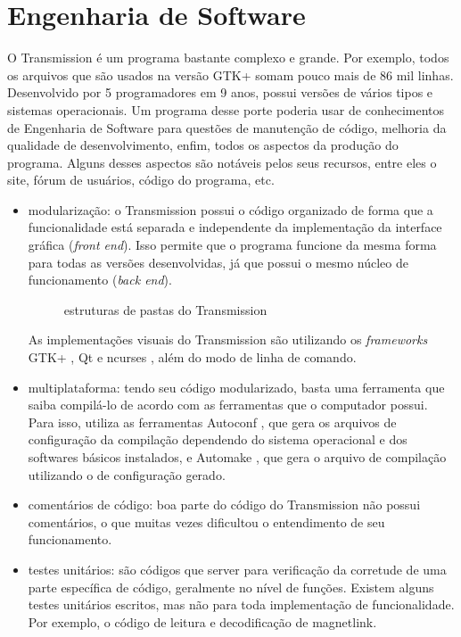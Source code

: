 
\section{Engenharia de Software}

O Transmission é um programa bastante complexo e grande. Por exemplo, todos os arquivos
que são usados na versão GTK+ somam pouco mais de 86 mil linhas. Desenvolvido por 5
programadores em 9 anos, possui versões de vários tipos e sistemas operacionais. Um
programa desse porte poderia usar de conhecimentos de Engenharia de Software para
questões de manutenção de código, melhoria da qualidade de desenvolvimento, enfim,
todos os aspectos da produção do programa. Alguns desses aspectos são notáveis pelos
seus recursos, entre eles o site, fórum de usuários, código do programa, etc.

\begin{itemize}
    \item modularização: o Transmission possui o código organizado de forma que a
        funcionalidade está separada e independente da implementação da interface
        gráfica (\emph{front end}). Isso permite que o programa funcione da mesma forma
        para todas as versões desenvolvidas, já que possui o mesmo núcleo de
        funcionamento (\emph{back end}).

    \begin{figure}[H]
        \centering
        \caption{estruturas de pastas do Transmission}
        \label{fig:pastas}
    \end{figure}

        As implementações visuais do Transmission são utilizando os \emph{frameworks}
        GTK+ \cite{site:gtk}, Qt \cite{site:gtk} e ncurses \cite{site:gtk}, além do
        modo de linha de comando.

    \item multiplataforma: tendo seu código modularizado, basta uma ferramenta que saiba
        compilá-lo de acordo com as ferramentas que o computador possui. Para isso,
        utiliza as ferramentas Autoconf \cite{site:gtk}, que gera os arquivos de
        configuração da compilação dependendo do sistema operacional e dos softwares
        básicos instalados, e Automake \cite{site:gtk}, que gera o arquivo de
        compilação utilizando o de configuração gerado.

    \item comentários de código: boa parte do código do Transmission não possui
        comentários, o que muitas vezes dificultou o entendimento de seu funcionamento.

    \item testes unitários: são códigos que server para verificação da corretude de uma
        parte específica de código, geralmente no nível de funções. Existem alguns
        testes unitários escritos, mas não para toda implementação de funcionalidade.
        Por exemplo, o código de leitura e decodificação de \gls{magnetlink}.
\end{itemize}

